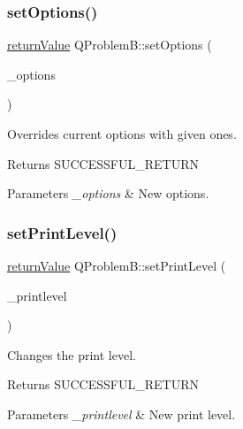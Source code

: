 \subsubsection{\texorpdfstring{set\+Options()}{setOptions()}}
{\footnotesize\ttfamily \hyperlink{_message_handling_8hpp_a81d556f613bfbabd0b1f9488c0fa865e}{return\+Value} Q\+Problem\+B\+::set\+Options (\begin{DoxyParamCaption}\item[{const \hyperlink{class_options}{Options} \&}]{\+\_\+options }\end{DoxyParamCaption})\hspace{0.3cm}{\ttfamily [inline]}}

Overrides current options with given ones. \begin{DoxyReturn}{Returns}
S\+U\+C\+C\+E\+S\+S\+F\+U\+L\+\_\+\+R\+E\+T\+U\+RN 
\end{DoxyReturn}

\begin{DoxyParams}{Parameters}
{\em \+\_\+options} & New options. \\
\hline
\end{DoxyParams}
\mbox{\label{class_q_problem_b_a2be2208a1befa1f7fa03f3c11d91ae7b}} 
\subsubsection{\texorpdfstring{set\+Print\+Level()}{setPrintLevel()}}
{\footnotesize\ttfamily \hyperlink{_message_handling_8hpp_a81d556f613bfbabd0b1f9488c0fa865e}{return\+Value} Q\+Problem\+B\+::set\+Print\+Level (\begin{DoxyParamCaption}\item[{\hyperlink{_types_8hpp_a83ff212f474e3669d8fac2d727f65de5}{Print\+Level}}]{\+\_\+printlevel }\end{DoxyParamCaption})}

Changes the print level. \begin{DoxyReturn}{Returns}
S\+U\+C\+C\+E\+S\+S\+F\+U\+L\+\_\+\+R\+E\+T\+U\+RN 
\end{DoxyReturn}

\begin{DoxyParams}{Parameters}
{\em \+\_\+printlevel} & New print level. \\
\hline
\end{DoxyParams}
\mbox{\label{class_q_problem_b_a529829d8e9a31570bbf11c26d7c3525a}} 
